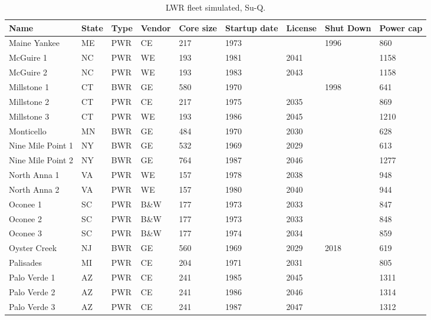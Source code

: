 \begin{table}[H]
    \centering
    \caption{LWR fleet simulated, Su-Q.}
    \label{tab:lwr_fleet3}
    \begin{tabular}{l l l l l l l l l}
    \hline
    \textbf{Name} & \textbf{State} & \textbf{Type} & \textbf{Vendor} & \textbf{Core size} & \textbf{Startup date} & \textbf{License} & \textbf{Shut Down} & \textbf{Power cap} \\
    \hline
    Maine Yankee        & ME & PWR & CE   & 217 & 1973 &      & 1996 & 860 \\
    McGuire 1           & NC & PWR & WE   & 193 & 1981 & 2041 &      & 1158\\
    McGuire 2           & NC & PWR & WE   & 193 & 1983 & 2043 &      & 1158\\
    Millstone 1         & CT & BWR & GE   & 580 & 1970 &      & 1998 & 641 \\
    Millstone 2         & CT & PWR & CE   & 217 & 1975 & 2035 &      & 869 \\
    Millstone 3         & CT & PWR & WE   & 193 & 1986 & 2045 &      & 1210\\
    Monticello          & MN & BWR & GE   & 484 & 1970 & 2030 &      & 628 \\
    Nine Mile Point 1   & NY & BWR & GE   & 532 & 1969 & 2029 &      & 613 \\
    Nine Mile Point 2   & NY & BWR & GE   & 764 & 1987 & 2046 &      & 1277\\
    North Anna 1        & VA & PWR & WE   & 157 & 1978 & 2038 &      & 948 \\
    North Anna 2        & VA & PWR & WE   & 157 & 1980 & 2040 &      & 944 \\
    Oconee 1            & SC & PWR & B\&W & 177 & 1973 & 2033 &      & 847 \\
    Oconee 2            & SC & PWR & B\&W & 177 & 1973 & 2033 &      & 848 \\
    Oconee 3            & SC & PWR & B\&W & 177 & 1974 & 2034 &      & 859 \\
    Oyster Creek        & NJ & BWR & GE   & 560 & 1969 & 2029 & 2018 & 619 \\
    Palisades           & MI & PWR & CE   & 204 & 1971 & 2031 &      & 805 \\
    Palo Verde 1        & AZ & PWR & CE   & 241 & 1985 & 2045 &      & 1311\\
    Palo Verde 2        & AZ & PWR & CE   & 241 & 1986 & 2046 &      & 1314\\
    Palo Verde 3        & AZ & PWR & CE   & 241 & 1987 & 2047 &      & 1312\\

\end{tabular}
\end{table}
